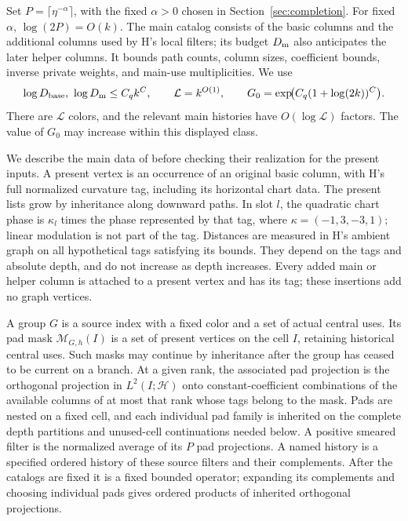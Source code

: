 Set \(P=\lceil\eta^{-\alpha}\rceil\), with the fixed \(\alpha>0\)
chosen in Section~\ref{sec:completion}.  For fixed \(\alpha\),
\(\log(2P)=O(k)\).  The main catalog consists of
the basic columns and the additional columns used by H's local
filters; its budget \(D_{\rm m}\) also anticipates the later helper
columns.  It bounds path counts, column sizes, coefficient bounds,
inverse private weights, and main-use multiplicities.  We use
\[
 \log D_{\rm base},\ \log D_{\rm m}\le C_qk^C,\qquad
 \mathcal L=k^{O(1)},\qquad
 G_0=\exp\!\bigl(C_q(1+\log(2k))^C\bigr).
\]
There are \(\mathcal L\) colors, and the relevant main histories have
\(O(\log\mathcal L)\) factors.  The value of \(G_0\) may increase
within this displayed class.

We describe the main data of \cite[Section~6]{H} before checking
their realization for the present inputs.  A present vertex is an
occurrence of an original basic column, with H's full normalized
curvature tag, including its horizontal chart data.  The present
lists grow by inheritance along downward paths.  In slot \(l\),
the quadratic chart phase is \(\kappa_l\) times the phase represented
by that tag, where \(\kappa=(-1,3,-3,1)\); linear modulation is not
part of the tag.  Distances are measured in H's ambient graph on all
hypothetical tags satisfying its bounds.  They depend on the tags and
absolute depth, and do not increase as depth increases.  Every added main
or helper column is attached to a present vertex and has its tag;
these insertions add no graph vertices.

A group \(G\) is a source index with a fixed color and a set of
actual central uses.  Its pad mask \(\mathcal M_{G,h}(I)\) is a set of
present vertices on the cell \(I\), retaining historical central
uses.  Such masks may continue by inheritance after the group has
ceased to be current on a branch.  At a given rank, the associated
pad projection is the orthogonal projection in \(L^2(I;\mathcal H)\) onto
constant-coefficient combinations of the available columns of at
most that rank whose tags belong to the mask.  Pads are nested on a
fixed cell, and each individual pad family is inherited on the
complete depth partitions and unused-cell continuations needed
below.  A positive smeared filter is the normalized average of its
\(P\) pad projections.  A named history is a specified ordered
history of these source filters and their complements.  After the
catalogs are fixed it is a fixed bounded operator; expanding its
complements and choosing individual pads gives ordered products of
inherited orthogonal projections.

